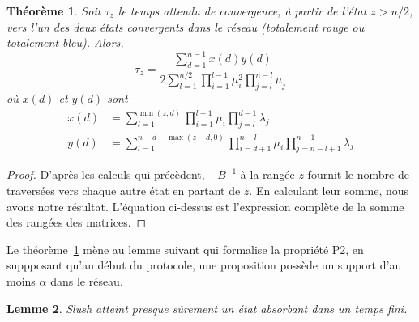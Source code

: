 \documentclass[a4,twocolumn,10pt]{article}
\newcommand\ddfrac[2]{\frac{\displaystyle #1}{\displaystyle #2}}
\newtheorem{theorem}{Théorème}
\newtheorem{lemma}[theorem]{Lemme}
\theoremstyle{definition}
\begin{document}
\begin{appendices}
\begin{theorem}
\label{theorem:mean-convergence-time}
Soit $\tau_z$ le temps attendu de convergence, à partir de l'état $z > n/2$, vers l'un des deux états convergents dans le réseau (totalement rouge ou totalement bleu). Alors,
\begin{equation}
\tau_z = \ddfrac{\sum_{d = 1}^{n-1}x(d)y(d)}{2\sum_{l = 1}^{n/2}\prod_{i=1}^{l-1}\mu_i^2\prod_{j=l}^{n-l}\mu_j}
\end{equation}
où $x(d)$ et $y(d)$ sont
\begin{equation}
\begin{split}
x(d) &= \sum_{l = 1}^{\min(z, d)} \prod_{i=1}^{l-1} \mu_i \prod_{j = l}^{d-1} \lambda_j\\
y(d) &= \sum_{l = 1}^{n - d - \max(z-d, 0)} \prod_{i = d+1}^{n-l} \mu_i \prod_{j = n - l + 1}^{n - 1} \lambda_j
\end{split}
\end{equation}
\end{theorem}

\begin{proof}
D'après les calculs qui précèdent, $-B^{-1}$ à la rangée $z$ fournit le nombre de traversées vers chaque autre état en partant de $z$. En calculant leur somme, nous avons notre résultat. L'équation ci-dessus est l'expression complète de la somme des rangées des matrices.
\end{proof}

Le théorème~\ref{theorem:mean-convergence-time} mène au lemme suivant qui formalise
la propriété P2, en suppposant qu'au début du protocole, une proposition possède un support d'au moins $\alpha$ dans le réseau.
\begin{lemma}
Slush atteint presque sûrement un état absorbant dans un temps fini.
\label{lemma:finitetermination}
\end{lemma}


\end{appendices}
\end{document}
